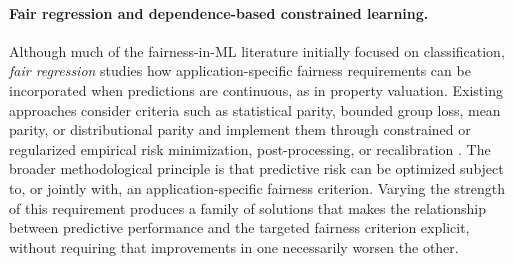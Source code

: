 \documentclass[10pt]{article}
\theoremstyle{definition}
\newcommand{\1}{\mathbf{1}}
\newcommand{\oldtext}[1]{\textcolor{blue}{\sout{#1}}}
\newcommand{\newtext}[1]{\textcolor{impGreen}{#1}}
\begin{document}
\paragraph{Fair regression and dependence-based constrained learning.}


\newtext{Although much of the fairness-in-ML literature initially focused on classification, \emph{fair regression} studies how application-specific fairness requirements can be incorporated when predictions are continuous, as in property valuation. Existing approaches consider criteria such as statistical parity, bounded group loss, mean parity, or distributional parity and implement them through constrained or regularized empirical risk minimization, post-processing, or recalibration \cite{AgarwalDudikWu2019,FitzsimonsEtAl2019,ChzhenEtAl2020Wasserstein,ChzhenEtAl2020Recalibration,WeiEtAl2023}.} The broader methodological principle is that predictive risk can be optimized subject to, or jointly with, an application-specific fairness criterion. Varying the strength of this requirement produces a family of solutions that makes the relationship between predictive performance and the targeted fairness criterion explicit, without requiring that improvements in one necessarily worsen the other.
\end{document}
